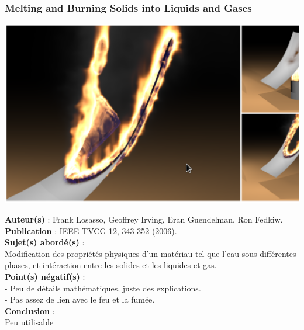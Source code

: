 \documentclass[a4paper,10pt]{article}
\begin{document}
\subsubsection{Melting and Burning Solids into Liquids and Gases}
    \begin{center}
	\includegraphics[scale=0.3]{Melting.ps}
    \end{center}
\textbf{Auteur(s)} : Frank Losasso, Geoffrey Irving, Eran Guendelman, Ron Fedkiw.\\
\textbf{Publication} : IEEE TVCG 12, 343-352 (2006).\\
\textbf{Sujet(s) abordé(s)} : \\
	Modification des propriétés physiques d'un matériau tel que l'eau sous différentes phases, et intéraction entre les solides et les liquides et gas. \\
\textbf{Point(s) négatif(s)} :\\
	- Peu de détails mathématiques, juste des explications.\\
	- Pas assez de lien avec le feu et la fumée.\\
\textbf{Conclusion} :\\
	Peu utilisable
\end{document}
